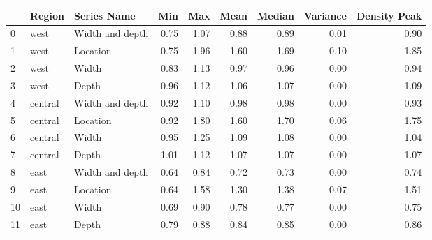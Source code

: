 \begin{tabular}{lllrrrrrr}
\toprule
{} &   Region &      Series Name &   Min &   Max &  Mean &  Median &  Variance &  Density Peak \\
\midrule
0  &     west &  Width and depth &  0.75 &  1.07 &  0.88 &    0.89 &      0.01 &          0.90 \\
1  &     west &         Location &  0.75 &  1.96 &  1.60 &    1.69 &      0.10 &          1.85 \\
2  &     west &            Width &  0.83 &  1.13 &  0.97 &    0.96 &      0.00 &          0.94 \\
3  &     west &            Depth &  0.96 &  1.12 &  1.06 &    1.07 &      0.00 &          1.09 \\
\midrule
4  &  central &  Width and depth &  0.92 &  1.10 &  0.98 &    0.98 &      0.00 &          0.93 \\
5  &  central &         Location &  0.92 &  1.80 &  1.60 &    1.70 &      0.06 &          1.75 \\
6  &  central &            Width &  0.95 &  1.25 &  1.09 &    1.08 &      0.00 &          1.04 \\
7  &  central &            Depth &  1.01 &  1.12 &  1.07 &    1.07 &      0.00 &          1.07 \\
\midrule
8  &     east &  Width and depth &  0.64 &  0.84 &  0.72 &    0.73 &      0.00 &          0.74 \\
9  &     east &         Location &  0.64 &  1.58 &  1.30 &    1.38 &      0.07 &          1.51 \\
10 &     east &            Width &  0.69 &  0.90 &  0.78 &    0.77 &      0.00 &          0.75 \\
11 &     east &            Depth &  0.79 &  0.88 &  0.84 &    0.85 &      0.00 &          0.86 \\
\bottomrule
\end{tabular}
